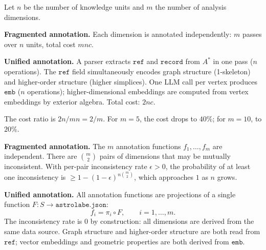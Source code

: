 \begin{proposition}
\label{prop:annotation}
Let $n$ be the number of knowledge units and $m$ the number of analysis dimensions.

\medskip
\noindent\textbf{Fragmented annotation.} Each dimension is annotated independently: $m$ passes over $n$ units, total cost $mnc$.

\medskip
\noindent\textbf{Unified annotation.} A parser extracts $\texttt{ref}$ and $\texttt{record}$ from $A^*$ in one pass ($n$ operations). The $\texttt{ref}$ field simultaneously encodes graph structure (1-skeleton) and higher-order structure (higher simplices). One LLM call per vertex produces $\texttt{emb}$ ($n$ operations); higher-dimensional embeddings are computed from vertex embeddings by exterior algebra. Total cost: $2nc$.

The cost ratio is $2n / mn = 2/m$. For $m = 5$, the cost drops to $40\%$; for $m = 10$, to $20\%$.
\end{proposition}

\begin{proposition}
\label{prop:consistency}
\textbf{Fragmented annotation.} The $m$ annotation functions $f_1, \ldots, f_m$ are independent. There are $\binom{m}{2}$ pairs of dimensions that may be mutually inconsistent. With per-pair inconsistency rate $\epsilon > 0$, the probability of at least one inconsistency is $\geq 1 - (1 - \epsilon)^{n\binom{m}{2}}$, which approaches $1$ as $n$ grows.

\medskip
\noindent\textbf{Unified annotation.} All annotation functions are projections of a single function $F : S \to \texttt{astrolabe.json}$:
\[
f_i = \pi_i \circ F, \qquad i = 1, \ldots, m.
\]
The inconsistency rate is $0$ by construction: all dimensions are derived from the same data source. Graph structure and higher-order structure are both read from $\texttt{ref}$; vector embeddings and geometric properties are both derived from $\texttt{emb}$.
\end{proposition}

